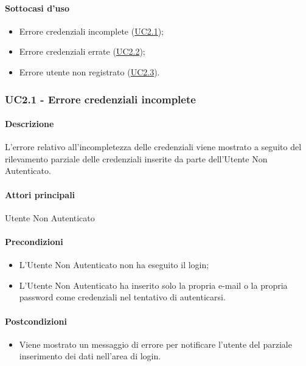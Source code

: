\paragraph*{Sottocasi d'uso}
\begin{itemize}
  \item Errore credenziali incomplete (\hyperref[UC2point1]{UC2.1});
  \item Errore credenziali errate (\hyperref[UC2point2]{UC2.2});
  \item Errore utente non registrato (\hyperref[UC2point3]{UC2.3}).
\end{itemize}


\subsubsection{UC2.1 - Errore credenziali incomplete}\label{UC2point1}
\paragraph*{Descrizione}
L’errore relativo all’incompletezza delle credenziali viene mostrato a seguito del rilevamento parziale delle credenziali inserite da parte dell’Utente Non Autenticato.

\paragraph*{Attori principali}
Utente Non Autenticato

\paragraph*{Precondizioni}
\begin{itemize}
  \item L’Utente Non Autenticato non ha eseguito il login;
  \item L’Utente Non Autenticato ha inserito solo la propria e-mail o la propria password come credenziali nel tentativo di autenticarsi.  
\end{itemize}

\paragraph*{Postcondizioni}
\begin{itemize}
  \item Viene mostrato un messaggio di errore per notificare l’utente del parziale inserimento dei dati nell’area di login.
\end{itemize}

